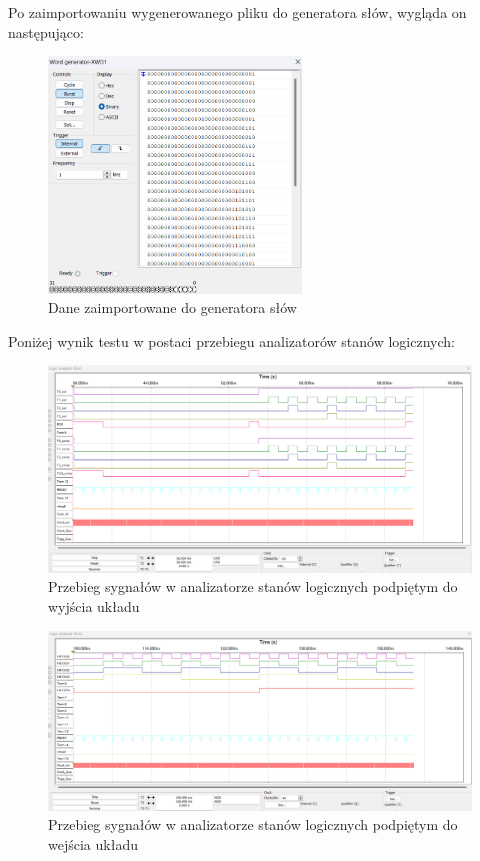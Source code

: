\documentclass[a4paper]{article}
\begin{document}
Po zaimportowaniu wygenerowanego pliku do generatora słów, wygląda on następująco:

\begin{figure}[H]
    \centering
    \includegraphics[width=0.6\textwidth]{floor_controller_test_word_generator.png}
    \caption{Dane zaimportowane do generatora słów}
\end{figure}

\pagebreak
Poniżej wynik testu w postaci przebiegu analizatorów stanów logicznych:

\begin{figure}[H]
    \centering
    \includegraphics[width=\textwidth]{floor_controller_test_logic_analizer_xla1.png}
    \caption{Przebieg sygnałów w analizatorze stanów logicznych podpiętym do wyjścia układu}
\end{figure}

\begin{figure}[H]
    \centering
    \includegraphics[width=\textwidth]{floor_controller_test_logic_analizer_xla2.png}
    \caption{Przebieg sygnałów w analizatorze stanów logicznych podpiętym do wejścia układu}
\end{figure}
\end{document}
